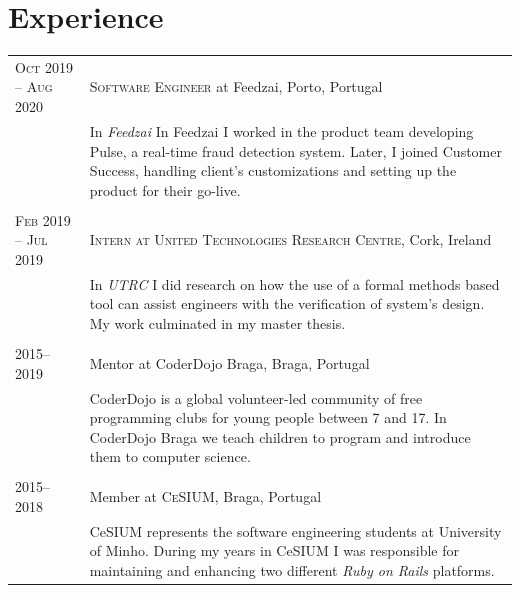 \documentclass[a4paper,10pt]{article}
\begin{document}
\section{Experience}
\begin{tabular}{p{2.4cm}|p{11cm}}
    \textsc{Oct 2019 -- Aug 2020} & \textsc{Software Engineer} at Feedzai, Porto, Portugal \\
                          & \footnotesize{In \textit{Feedzai} In Feedzai I worked in the product team developing Pulse, a real-time fraud detection system. Later, I joined Customer Success, handling client's customizations and setting up the product for their go-live.} \\

    \multicolumn{2}{c}{} \\
    
    \textsc{Feb 2019 -- Jul 2019} & \textsc{Intern at United Technologies Research Centre}, Cork, Ireland \\
                          & \footnotesize{In \textit{UTRC} I did research on how the use of a formal methods based tool can assist engineers with the verification of system's design. My work culminated in my master thesis.} \\

    \multicolumn{2}{c}{} \\

    \textsc{2015--2019} & Mentor at CoderDojo Braga, Braga, Portugal \\
                          & \footnotesize{CoderDojo is a global volunteer-led community of free programming clubs for young people between 7 and 17. In CoderDojo Braga we teach children to program and introduce them to computer science.} \\

    \multicolumn{2}{c}{} \\

    \textsc{2015--2018} & Member at \textsc{CeSIUM}, Braga, Portugal \\
                          & \footnotesize{CeSIUM represents the software engineering students at University of Minho. During my years in CeSIUM I was responsible for maintaining and enhancing two different \textit{Ruby on Rails} platforms.} \\
\end{tabular}
\end{document}
